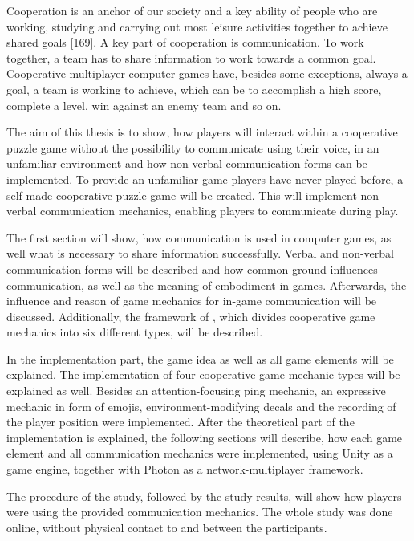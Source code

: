 Cooperation is an anchor of our society and a key ability of people who are working, studying and carrying out most leisure activities together to achieve shared goals \autocite{Morschheuser2017HowGame}[169]. A key part of cooperation is communication. To work together, a team has to share information to work towards a common goal.
Cooperative multiplayer computer games have, besides some exceptions, always a goal, a team is working to achieve, which can be to accomplish a high score, complete a level, win against an enemy team and so on.

The aim of this thesis is to show, how players will interact within a cooperative puzzle game without the possibility to communicate using their voice, in an unfamiliar environment and how non-verbal communication forms can be implemented. 
To provide an unfamiliar game players have never played before, a self-made cooperative puzzle game will be created. This will implement non-verbal communication mechanics, enabling players to communicate during play.

The first section will show, how communication is used in computer games, as well what is necessary to share information successfully. Verbal and non-verbal communication forms will be described and how common ground influences communication, as well as the meaning of embodiment in games.
Afterwards, the influence and reason of game mechanics for in-game communication will be discussed. Additionally, the framework of \textcite{Toups2014ATheory}, which divides cooperative game mechanics into six different types, will be described.

In the implementation part, the game idea as well as all game elements will be explained. 
The implementation of four cooperative game mechanic types will be explained as well. Besides an attention-focusing ping mechanic, an expressive mechanic in form of emojis, environment-modifying decals and the recording of the player position were implemented.
After the theoretical part of the implementation is explained, the following sections will describe, how each game element and all communication mechanics were implemented, using Unity as a game engine, together with Photon as a network-multiplayer framework.

The procedure of the study, followed by the study results, will show how players were using the provided communication mechanics. The whole study was done online, without physical contact to and between the participants.